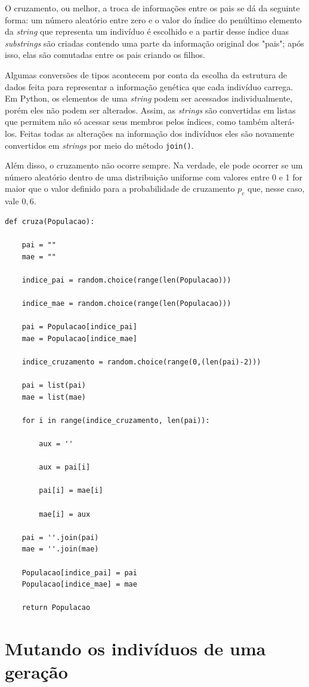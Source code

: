 \documentclass[11pt]{article}
\begin{document}
O cruzamento, ou melhor, a troca de informações entre os pais se dá da seguinte forma: um número aleatório entre zero e o valor do índice do penúltimo elemento da \emph{string} que representa um indivíduo é escolhido e a partir desse índice duas \emph{substrings} são criadas contendo uma parte da informação original dos "pais"; após isso, elas são comutadas entre os pais criando os filhos.

Algumas conversões de tipos acontecem por conta da escolha da estrutura de dados feita para representar a informação genética que cada indivíduo carrega. Em Python, os elementos de uma \emph{string} podem ser acessados individualmente, porém eles não podem ser alterados. Assim, as \emph{strings} são convertidas em listas que permitem não só acessar seus membros pelos índices, como também alterá-los. Feitas todas as alterações na informação dos indivíduos eles são novamente convertidos em \emph{strings} por meio do método \texttt{join()}.

Além disso, o cruzamento não ocorre sempre. Na verdade, ele pode ocorrer se um número aleatório dentro de uma distribuição uniforme com valores entre 0 e 1 for maior que o valor definido para a probabilidade de cruzamento $p_c$ que, nesse caso, vale $0,6$.

\begin{lstlisting}
def cruza(Populacao):

	pai = ""
	mae = ""
	
	indice_pai = random.choice(range(len(Populacao)))

	indice_mae = random.choice(range(len(Populacao)))
	
	pai = Populacao[indice_pai]
	mae = Populacao[indice_mae]
	
	indice_cruzamento = random.choice(range(0,(len(pai)-2)))
	
	pai = list(pai)
	mae = list(mae)
	
	for i in range(indice_cruzamento, len(pai)):
		
		aux = ''
		
		aux = pai[i]
		
		pai[i] = mae[i]
		
		mae[i] = aux
	
	pai = ''.join(pai)
	mae = ''.join(mae)
	
	Populacao[indice_pai] = pai
	Populacao[indice_mae] = mae
	
	return Populacao
\end{lstlisting}

\section{Mutando os indivíduos de uma geração}
\end{document}
